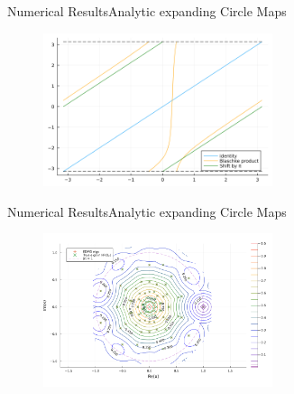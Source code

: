\documentclass[
  english,            %
  aspectratio=169,    %
]{tumbeamer}
\begin{document}
\begin{frame}{Numerical Results}{Analytic expanding Circle Maps}

\begin{figure}
  \centering
  \includegraphics[width=0.6\textwidth]{blaschke.png}
\end{figure}

\end{frame}

\begin{frame}{Numerical Results}{Analytic expanding Circle Maps}

\begin{figure}
  \centering
  \includegraphics[width=0.6\textwidth]{pseudospectrum_blaschke.png}
\end{figure}

\end{frame}
\end{document}
